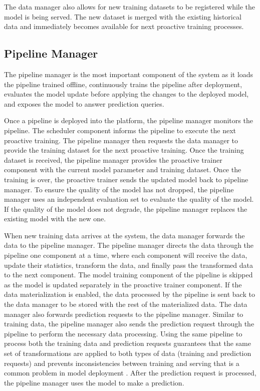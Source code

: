 The data manager also allows for new training datasets to be registered while the model is being served.
The new dataset is merged with the existing historical data and immediately becomes available for next proactive training processes.

\subsection{Pipeline Manager} \label{pipeline-manager} 
The pipeline manager is the most important component of the system as it loads the pipeline trained offline, continuously trains the pipeline after deployment, evaluates the model update before applying the changes to the deployed model, and exposes the model to answer prediction queries.

Once a pipeline is deployed into the platform, the pipeline manager monitors the pipeline.
The scheduler component informs the pipeline to execute the next proactive training.
The pipeline manager then requests the data manager to provide the training dataset for the next proactive training.
Once the training dataset is received, the pipeline manager provides the proactive trainer component with the current model parameter and training dataset.
Once the training is over, the proactive trainer sends the updated model back to pipeline manager.
To ensure the quality of the model has not dropped, the pipeline manager uses an independent evaluation set to evaluate the quality of the model.
If the quality of the model does not degrade, the pipeline manager replaces the existing model with the new one.

When new training data arrives at the system, the data manager forwards the data to the pipeline manager. 
The pipeline manager directs the data through the pipeline one component at a time, where each component will receive the data, update their statistics, transform the data, and finally pass the transformed data to the next component.
The model training component of the pipeline is skipped as the model is updated separately in the proactive trainer component.
If the data materialization is enabled, the data processed by the pipeline is sent back to the data manager to be stored with the rest of the materialized data.
The data manager also forwards prediction requests to the pipeline manager.
Similar to training data, the pipeline manager also sends the prediction request through the pipeline to perform the necessary data processing.
Using the same pipeline to process both the training data and prediction requests guarantees that the same set of transformations are applied to both types of data (training and prediction requests) and prevents inconsistencies between training and serving that is a common problem in model deployment \cite{baylor2017tfx}.
After the prediction request is processed, the pipeline manager uses the model to make a prediction.

